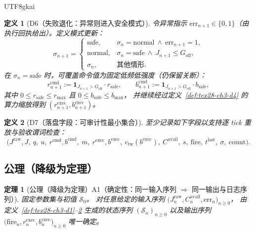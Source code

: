 \documentclass[12pt]{article}
\newtheorem{definition}{定义}[section]
\newtheorem{theorem}{定理}[section]
\newcommand{\indicator}[1]{\mathbf{1}_{#1}}
\begin{document}
\begin{CJK*}{UTF8}{gkai}
\begin{definition}[D6（失败退化：异常则进入安全模式）]
\label{def:tex28-ch3-d6}
令异常指示 $\mathrm{err}_{n+1}\in\{0,1\}$（由执行回执给出）。定义模式更新：
\[
  \sigma_{n+1}=
  \begin{cases}
    \mathrm{safe},& \sigma_n=\mathrm{normal}\ \wedge\ \mathrm{err}_{n+1}=1,\\
    \mathrm{normal},& \sigma_n=\mathrm{safe}\ \wedge\ J_{n+1}\le G_{\mathrm{off}},\\
    \sigma_n,& \text{其他情形}.
  \end{cases}
\]
在 $\sigma_n=\mathrm{safe}$ 时，可覆盖命令值为固定低频低强度（仍保留关断）：
\[
  r^{\mathrm{cmd}}_{n+1}:=\indicator{J_{n+1}>G_{\mathrm{off}}}\cdot r_{\mathrm{safe}},
  \qquad
  b^{\mathrm{cmd}}_{n+1}:=\indicator{J_{n+1}>G_{\mathrm{off}}}\cdot b_{\mathrm{safe}},
\]
其中 $0\le r_{\mathrm{safe}}\le r_{\max}$ 且 $0\le b_{\mathrm{safe}}\le b_{\max}$，
并继续经过定义~\ref{def:tex28-ch3-d4} 的算力缩放得到 $(r^{\mathrm{exec}}_{n+1},b^{\mathrm{exec}}_{n+1})$。
\end{definition}

\begin{definition}[D7（落盘字段：可审计性最小集合）]
\label{def:tex28-ch3-d7}
至少记录如下字段以支持逐 tick 重放与验收谓词检查：
\[
  \bigl(J^{\mathrm{raw}},J,\ q,\ u,\ r^{\mathrm{cmd}},b^{\mathrm{cmd}},\ m,\ r^{\mathrm{exec}},b^{\mathrm{exec}},\
  c_{\mathrm{tw}}(b^{\mathrm{exec}}),\ C^{\mathrm{avail}},\ s,\ \mathrm{fire},\ t^{\mathrm{last}},\ \sigma,\
    \mathrm{count}\bigr).
\]
\end{definition}

\subsection{公理（降级为定理）}
\label{subsec:tex28-ch3-axioms}

\begin{theorem}[公理（降级为定理）A1（确定性：同一输入序列 $\Rightarrow$ 同一输出与日志序列）]
\label{thm:tex28-ch3-a1}
固定参数集与初值 $\mathcal{S}_0$。
对任意给定的输入序列 $\bigl(J^{\mathrm{raw}}_n,C^{\mathrm{avail}}_n,\mathrm{err}_n\bigr)_{n\ge 0}$，
由定义~\ref{def:tex28-ch3-d1}--\ref{def:tex28-ch3-d7} 生成的状态序列 $(\mathcal{S}_n)_{n\ge 0}$
以及输出序列 $\bigl(\mathrm{fire}_n,r^{\mathrm{exec}}_n,b^{\mathrm{exec}}_n\bigr)_{n\ge 0}$ 唯一确定。
\end{theorem}


\end{CJK*}
\end{document}
